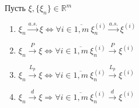 \begin{proposition}
	Пусть $\displaystyle \xi ,\{\xi _{n}\} \in \mathbb{R}^{m}$
	
	\begin{enumerate}
		\item $\displaystyle \xi _{n}\xrightarrow{a.s.} \xi \Leftrightarrow \forall i\in \overline{1,m} \ \xi _{n}^{( i)}\xrightarrow{a.s.} \xi ^{( i)}$
		
		\item $\displaystyle \xi _{n}\xrightarrow{P} \xi \Leftrightarrow \forall i\in \overline{1,m} \ \xi _{n}^{( i)}\xrightarrow{P} \xi ^{( i)}$
		
		\item $\displaystyle \xi _{n}\xrightarrow{L_{p}} \xi \Leftrightarrow \forall i\in \overline{1,m} \ \xi _{n}^{( i)}\xrightarrow{L_{p}} \xi ^{( i)}$
		
		\item $\displaystyle \xi _{n}\xrightarrow{d} \xi \Rightarrow \forall i\in \overline{1,m} \ \xi _{n}^{( i)}\xrightarrow{d} \xi ^{( i)}$
	\end{enumerate}
	
\end{proposition}


